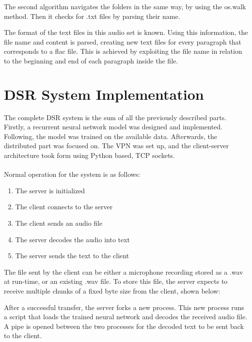 

The second algorithm navigates the folders in the same way, by using the os.walk method. Then it checks for .txt files by parsing their name. 



The format of the text files in this audio set is known. Using this information, the file name and content is parsed, creating new text files for every paragraph that corresponds to a flac file. This is achieved by exploiting the file name in relation to the beginning and end of each paragraph inside the file.
 
 
 
\section{DSR System Implementation}

The complete DSR system is the sum of all the previously described parts. Firstly, a recurrent neural network model was designed and implemented. Following, the model was trained on the available data.
Afterwards, the distributed part was focused on. The VPN was set up, and the client-server architecture took form using Python based, TCP sockets.\\\\
Normal operation for the system is as follows:
\begin{enumerate}
\item The server is initialized
\item The client connects to the server
\item The client sends an audio file
\item The server decodes the audio into text
\item The server sends the text to the client
\end{enumerate}
The file sent by the client can be either a microphone recording stored as a .wav at run-time, or an existing .wav file. To store this file, the server expects to receive multiple chunks of a fixed byte size from the client, shown below:
 
After a successful transfer, the server forks a new process. 
This new process runs a script that loads the trained neural network and decodes the received audio file. A pipe is opened between the two processes for the decoded text to be sent back to the client.


